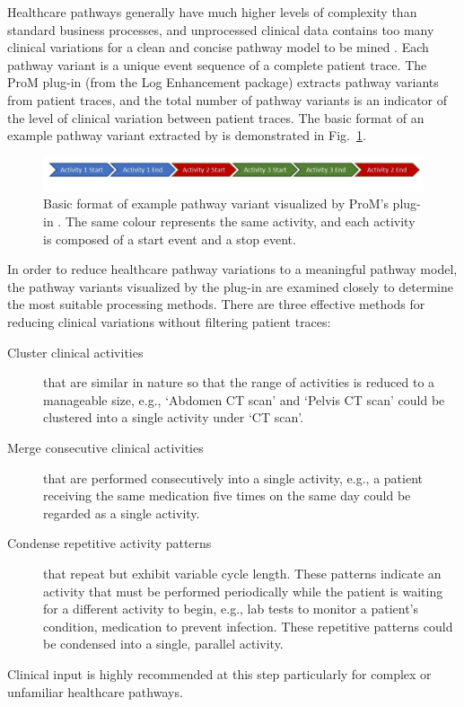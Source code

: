 Healthcare pathways generally have much higher levels of complexity than standard business processes, and unprocessed clinical data contains too many clinical variations for a clean and concise pathway model to be mined \cite{Huang2013, Veiga2010}. Each pathway variant is a unique event sequence of a complete patient trace. The ProM plug-in  (from the Log Enhancement package) extracts pathway variants from patient traces, and the total number of pathway variants is an indicator of the level of clinical variation between patient traces. The basic format of an example pathway variant extracted by  is demonstrated in  Fig.~\ref{fig:example pathway variant}.

\begin{figure}[t]
\centering
\includegraphics[width=\textwidth]{images/example_pathway_variant_format2.jpg}
\caption{Basic format of example pathway variant visualized by ProM's
  plug-in . The same colour represents the same activity, and each activity is composed of a start event and a stop event.}
\label{fig:example pathway variant}
\end{figure}

In order to reduce healthcare pathway variations to a meaningful pathway model, the pathway variants visualized by the plug-in  are examined closely to determine the most suitable processing methods. 
There are three effective methods for reducing clinical variations without filtering patient traces:

\begin{description}
    \item[Cluster clinical activities] that are similar in nature so that the range of activities is reduced to a manageable size, e.g., `Abdomen CT scan' and `Pelvis CT scan' could be clustered into a single activity under `CT scan'.
    \item[Merge consecutive clinical activities] that are performed consecutively into a single activity, e.g., a patient receiving the same medication five times on the same day could be regarded as a single activity.
    \item[Condense repetitive activity patterns] 
         that repeat but exhibit variable cycle length. These patterns indicate an activity that must be performed periodically while the patient is waiting for a different activity to begin, e.g., lab tests to monitor a patient’s condition, medication to prevent infection. These repetitive patterns could be condensed into a single, parallel activity.
\end{description}
Clinical input is highly recommended at this step particularly for complex or unfamiliar healthcare pathways. 

